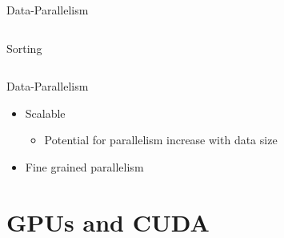 \documentclass[xcolor=dvipsnames]{beamer}
\begin{document}
\begin{frame}{Data-Parallelism}
\begin{columns}
\begin{column}{.48\textwidth}
  Sorting

  \end{column}
  
  \end{columns}

\end{frame}


\begin{frame}{Data-Parallelism}

  \begin{itemize} 
    \item Scalable
      \begin{itemize} 
        \item Potential for parallelism increase with data size 
      \end{itemize}
    \item Fine grained parallelism 
  \end{itemize} 

\end{frame}

%
\section{GPUs and CUDA}
\end{document}
